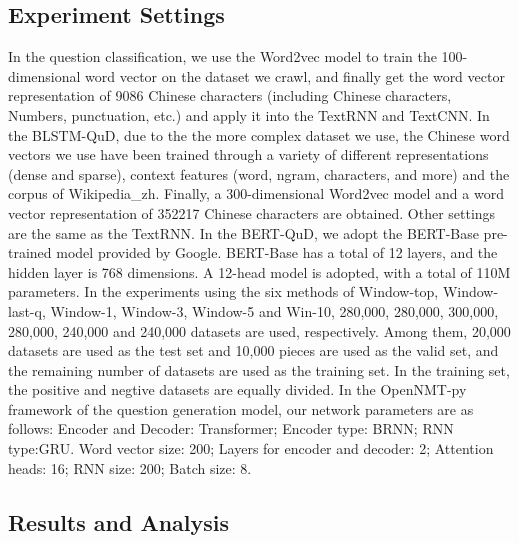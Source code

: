 \subsection{Experiment Settings}
In the question classification, we use the Word2vec model 
to train the 100-dimensional word vector on the dataset we crawl, 
and finally get the word vector representation of 9086 Chinese characters 
(including Chinese characters, Numbers, punctuation, etc.) 
and apply it into the TextRNN and TextCNN. In the BLSTM-QuD, due to the the more complex 
dataset we use, the Chinese word vectors we use have been trained through 
a variety of different representations (dense and sparse), 
context features (word, ngram, characters, and more) and the 
corpus of Wikipedia\_zh. Finally, a 300-dimensional Word2vec model and 
a word vector representation of 352217 Chinese characters are obtained. 
Other settings are the same as the TextRNN. In the BERT-QuD, 
we adopt the BERT-Base pre-trained model provided by Google. 
BERT-Base has a total of 12 layers, and the hidden layer is 768 dimensions. 
A 12-head model is adopted, with a total of 110M parameters. 
In the experiments using the six methods of Window-top, Window-last-q, Window-1, Window-3, Window-5 and Win-10, 280,000, 280,000, 300,000, 280,000, 240,000 and 240,000 datasets are used, respectively. Among them, 20,000 datasets are used as the test set and 10,000 pieces are used as the valid set, and the remaining number of datasets are used as the training set. In the training set, the positive and negtive datasets are equally divided. In the OpenNMT-py framework of the question generation model, our network parameters are as follows: Encoder and Decoder: Transformer; Encoder type: BRNN; RNN type:GRU. Word vector size: 200; Layers for encoder and decoder: 2; Attention heads: 16; RNN size: 200; Batch size: 8. 

\subsection{Results and Analysis}
